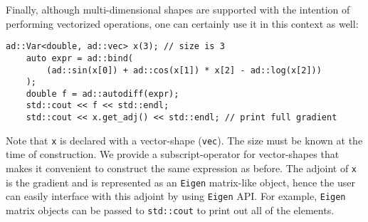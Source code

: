 Finally, although multi-dimensional shapes are supported with the intention of
performing vectorized operations, one can certainly use it in this context as well:
\begin{lstlisting}[style=customcpp]
    ad::Var<double, ad::vec> x(3); // size is 3
    auto expr = ad::bind(
        (ad::sin(x[0]) + ad::cos(x[1]) * x[2] - ad::log(x[2]))
    );
    double f = ad::autodiff(expr);
    std::cout << f << std::endl;
    std::cout << x.get_adj() << std::endl; // print full gradient
\end{lstlisting}
Note that \verb|x| is declared with a vector-shape (\verb|vec|).
The size must be known at the time of construction.
We provide a subscript-operator for vector-shapes
that makes it convenient to construct the same expression as before.
The adjoint of \verb|x| is the gradient and 
is represented as an \verb|Eigen| matrix-like object,
hence the user can easily interface with this adjoint by using \verb|Eigen| API.\@
For example, \verb|Eigen| matrix objects can be passed to \verb|std::cout|
to print out all of the elements.
